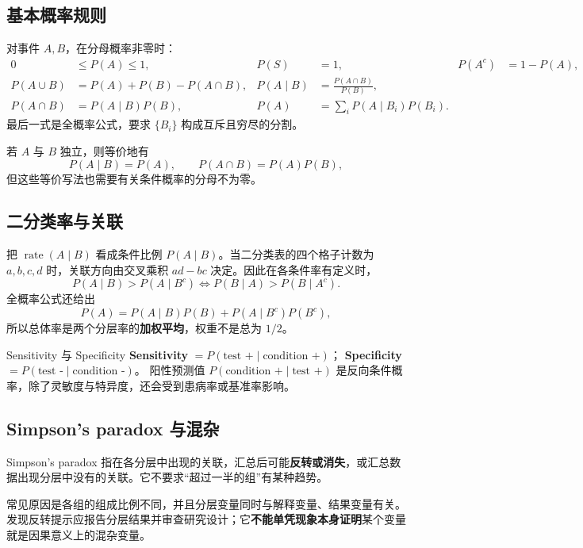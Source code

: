 \documentclass[11pt,a4paper,fontset=fandol]{ctexart}
\begin{document}
\subsection{基本概率规则}

对事件 $A,B$，在分母概率非零时：
\begin{align*}
0&\leq P(A)\leq 1, & P(S)&=1, & P(A^c)&=1-P(A),\\
P(A\cup B)&=P(A)+P(B)-P(A\cap B),
& P(A\mid B)&=\frac{P(A\cap B)}{P(B)},\\
P(A\cap B)&=P(A\mid B)P(B),
& P(A)&=\sum_i P(A\mid B_i)P(B_i).
\end{align*}
最后一式是全概率公式，要求 $\{B_i\}$ 构成互斥且穷尽的分割。

若 $A$ 与 $B$ 独立，则等价地有
\[
P(A\mid B)=P(A),\qquad P(A\cap B)=P(A)P(B),
\]
但这些等价写法也需要有关条件概率的分母不为零。

\subsection{二分类率与关联}

把 $\operatorname{rate}(A\mid B)$ 看成条件比例 $P(A\mid B)$。当二分类表的四个格子计数为 $a,b,c,d$ 时，关联方向由交叉乘积 $ad-bc$ 决定。因此在各条件率有定义时，
\[
P(A\mid B)>P(A\mid B^c)
\Longleftrightarrow
P(B\mid A)>P(B\mid A^c).
\]
全概率公式还给出
\[
P(A)=P(A\mid B)P(B)+P(A\mid B^c)P(B^c),
\]
所以总体率是两个分层率的\textbf{加权平均}，权重不是总为 $1/2$。

\begin{keybox}{Sensitivity 与 Specificity}
\textbf{Sensitivity} $=P(\text{test +}\mid\text{condition +})$；
\textbf{Specificity} $=P(\text{test -}\mid\text{condition -})$。
阳性预测值 $P(\text{condition +}\mid\text{test +})$ 是反向条件概率，除了灵敏度与特异度，还会受到患病率或基准率影响。
\end{keybox}

\subsection{Simpson's paradox 与混杂}

Simpson's paradox 指在各分层中出现的关联，汇总后可能\textbf{反转或消失}，或汇总数据出现分层中没有的关联。它不要求“超过一半的组”有某种趋势。

常见原因是各组的组成比例不同，并且分层变量同时与解释变量、结果变量有关。发现反转提示应报告分层结果并审查研究设计；它\textbf{不能单凭现象本身证明}某个变量就是因果意义上的混杂变量。
\end{document}
